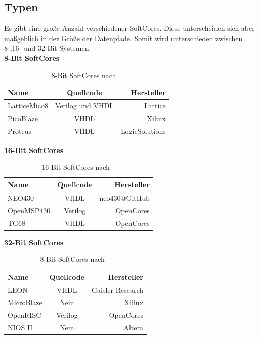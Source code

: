 \subsection{Typen}\label{kap:typen}
Es gibt eine große Anzahl verschiedener SoftCores. Diese unterscheiden sich aber maßgeblich in der Größe der Datenpfade.
Somit wird unterschieden zwischen 8-,16- und 32-Bit Systemen.\cite{softcore}\\

\textbf{8-Bit SoftCores}\\
\begin{table}[H]
\centering
\begin{tabular}{|l|c|r|}
  \hline
  \textbf{Name} & \textbf{Quellcode} & \textbf{Hersteller}\\
  \hline
  LatticeMico8 & Verilog und VHDL & Lattice\\
  \hline
  PicoBlaze & VHDL & Xilinx\\
  \hline
  Proteus & VHDL & LogicSolutions\\
  \hline
\end{tabular}
  \caption{8-Bit SoftCores nach ~\cite{softcore}}
 \label{tab:8bitsysteme}
  \end{table}

  \textbf{16-Bit SoftCores}\\
  \begin{table}[H]
  \centering
  \begin{tabular}{|l|c|r|}
    \hline
  \textbf{Name} & \textbf{Quellcode} & \textbf{Hersteller}\\
    \hline
    NEO430 & VHDL & neo430@GitHub\\
    \hline
    OpenMSP430 & Verilog & OpenCores\\
    \hline
    TG68 & VHDL & OpenCores\\
    \hline
  \end{tabular}
    \caption{16-Bit SoftCores nach ~\cite{softcore}}
   \label{tab:16bitsysteme}
    \end{table}

    \textbf{32-Bit SoftCores}\\
    \begin{table}[H]
    \centering
    \begin{tabular}{|l|c|r|}
      \hline
    \textbf{Name} & \textbf{Quellcode} & \textbf{Hersteller}\\
      \hline
      LEON & VHDL & Gaisler Research\\
      \hline
      MicroBlaze & Nein & Xilinx\\
      \hline
      OpenRISC & Verilog & OpenCores\\
      \hline
      NIOS II & Nein & Altera\\
      \hline
    \end{tabular}
      \caption{8-Bit SoftCores nach ~\cite{softcore}}
     \label{tab:8bitsysteme}
      \end{table}








